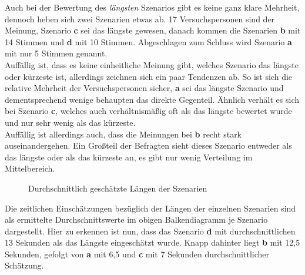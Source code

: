 \documentclass{Paper}
\begin{document}
Auch bei der Bewertung des \textit{längsten} Szenarios gibt es keine ganz klare Mehrheit, dennoch heben sich zwei Szenarien etwas ab. 17 Versuchspersonen sind der Meinung, Szenario \textbf{c} sei das längste gewesen, danach kommen die Szenarien \textbf{b} mit 14 Stimmen und \textbf{d} mit 10 Stimmen. Abgeschlagen zum Schluss wird Szenario \textbf{a} mit nur 5 Stimmen genannt.\\
Auffällig ist, dass es keine einheitliche Meinung gibt, welches Szenario das längste oder kürzeste ist, allerdings zeichnen sich ein paar Tendenzen ab. So ist sich die relative Mehrheit der Versuchspersonen sicher, \textbf{a} sei das längste Szenario und dementsprechend wenige behaupten das direkte Gegenteil. Ähnlich verhält es sich bei Szenario \textbf{c}, welches auch verhältnismäßig oft als das längste bewertet wurde und nur sehr wenig als das kürzeste.\\
Auffällig ist allerdings auch, dass die Meinungen bei \textbf{b} recht stark auseinandergehen. Ein Großteil der Befragten sieht dieses Szenario entweder als das längste oder als das kürzeste an, es gibt nur wenig Verteilung im Mittelbereich.
	
	
	
\begin{figure}	[H]
\caption{Durchschnittlich geschätzte Längen der Szenarien}
\label{LaengeSzenarien}
\end{figure}
\par
Die zeitlichen Einschätzungen bezüglich der Längen der einzelnen Szenarien sind als ermittelte Durchschnittswerte im obigen Balkendiagramm je Szenario dargestellt. Hier zu erkennen ist nun, dass das Szenario \textbf{d} mit durchschnittlichen 13 Sekunden als das Längste eingeschätzt wurde. Knapp dahinter liegt \textbf{b} mit 12,5 Sekunden, gefolgt von \textbf{a} mit 6,5 und \textbf{c} mit 7 Sekunden durchschnittlicher Schätzung.
\end{document}

